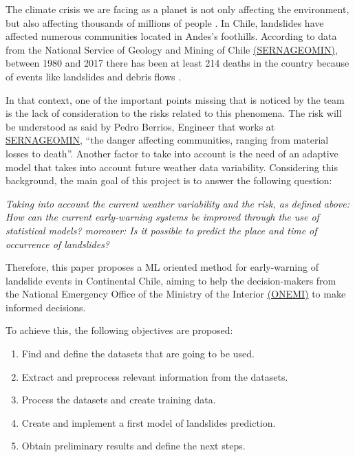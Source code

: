 \documentclass[sigconf, nonacm]{acmart}
\begin{document}
The climate crisis we are facing as a planet is not only affecting the environment, but also affecting thousands of millions of people \cite{landslidesandclimatechange}. In Chile, landslides have affected numerous communities located in Andes's foothills. According to data from the National Service of Geology and Mining of Chile \href{https://www.sernageomin.cl/}{(SERNAGEOMIN)}, between 1980 and 2017 there has been at least 214 deaths in the country because of events like landslides and debris flows \cite{sernageomin}. 

In that context, one of the important points missing that is noticed by the team is the lack of consideration to the risks related to this phenomena. The risk will be understood as said by Pedro Berrios, Engineer that works at \href{https://www.sernageomin.cl/}{SERNAGEOMIN}, ``the danger affecting communities, ranging from material losses to death''. Another factor to take into account is the need of an adaptive model that takes into account future weather data variability. Considering this background, the main goal of this project is to answer the following question: %


\textit{Taking into account the current weather variability and the risk, as defined above: How can the current early-warning systems be improved through
the use of statistical models? moreover: Is it possible to predict the place and time of occurrence of landslides?}

Therefore, this paper proposes a ML oriented method for early-warning of landslide events in Continental Chile, aiming to help the decision-makers from the National Emergency Office of the Ministry of the Interior \href{https://www.onemi.gov.cl/}{(ONEMI)} to make informed decisions.

To achieve this, the following objectives are proposed:
\begin{enumerate}
    \item Find and define the datasets that are going to be used.
    \item Extract and preprocess relevant information from the datasets.
    \item Process the datasets and create training data.
    \item Create and implement a first model of landslides prediction.
    \item Obtain preliminary results and define the next steps.
\end{enumerate}
\end{document}
